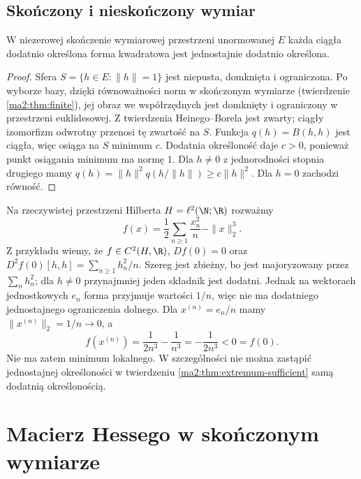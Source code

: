 \subsection*{Skończony i nieskończony wymiar}

\begin{stwierdzenie}
\label{ma2:prop:finite-positive-coercive}
W niezerowej skończenie wymiarowej przestrzeni
unormowanej $E$ każda ciągła dodatnio określona
forma kwadratowa jest jednostajnie dodatnio określona.
\end{stwierdzenie}
\begin{proof}
Sfera $S=\{h\in E:\|h\|=1\}$ jest niepusta, domknięta
i ograniczona. Po wyborze bazy, dzięki równoważności
norm w skończonym wymiarze (twierdzenie
\ref{ma2:thm:finite}), jej obraz we współrzędnych jest
domknięty i ograniczony w przestrzeni euklidesowej.
Z twierdzenia Heinego--Borela jest zwarty; ciągły
izomorfizm odwrotny przenosi tę zwartość na $S$.
Funkcja $q(h)=B(h,h)$ jest ciągła, więc osiąga na $S$
minimum $c$. Dodatnia określoność daje $c>0$,
ponieważ punkt osiągania minimum ma normę $1$.
Dla $h\ne0$ z jednorodności stopnia drugiego mamy
$q(h)=\|h\|^2q(h/\|h\|)\ge c\|h\|^2$.
Dla $h=0$ zachodzi równość.
\end{proof}

\begin{przyklad}
\label{ma2:ex:positive-not-coercive}
Na rzeczywistej przestrzeni Hilberta $H=\ell^2(\N;\R)$
rozważmy
\[
 f(x)=\frac12\sum_{n\ge1}\frac{x_n^2}{n}-\|x\|_2^3.
\]
Z przykładu
wiemy, że $f\in C^2(H,\R)$, $Df(0)=0$ oraz
$D^2f(0)[h,h]=\sum_{n\ge1}h_n^2/n$.
Szereg jest zbieżny, bo jest majoryzowany przez
$\sum_n h_n^2$; dla $h\ne0$ przynajmniej jeden
składnik jest dodatni. Jednak na wektorach jednostkowych
$e_n$ forma przyjmuje wartości $1/n$, więc nie ma
dodatniego jednostajnego ograniczenia dolnego.
Dla $x^{(n)}=e_n/n$ mamy $\|x^{(n)}\|_2=1/n\to0$, a
\[
 f(x^{(n)})=\frac{1}{2n^3}-\frac{1}{n^3}
 =-\frac{1}{2n^3}<0=f(0).
\]
Nie ma zatem minimum lokalnego. W szczególności
nie można zastąpić jednostajnej określoności w
twierdzeniu \ref{ma2:thm:extremum-sufficient} samą
dodatnią określonością.
\end{przyklad}

\section{Macierz Hessego w skończonym wymiarze}

